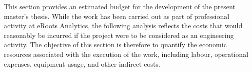 This section provides an estimated budget for the development of the present master's thesis. 
While the work has been carried out as part of professional activity at eRoots Analytics, 
the following analysis reflects the costs that would reasonably be incurred if the project were to be 
considered as an engineering activity. The objective of this section is therefore 
to quantify the economic resources associated with the execution of the work, including labour, operational 
expenses, equipment usage, and other indirect costs.

